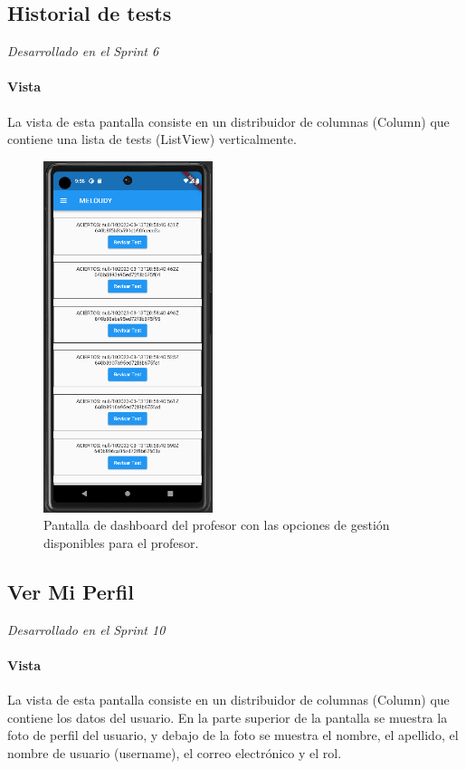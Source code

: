 \subsection{Historial de tests}
\textit{Desarrollado en el Sprint 6}
\label{sec:historial}

\paragraph*{Vista}
\label{sec:vista}
La vista de esta pantalla consiste en un distribuidor de columnas (Column) que contiene una lista de tests (ListView) verticalmente. 

\begin{figure}[H]
  \centering
  \includegraphics[width=0.44\textwidth]{imagenes/c7/historialtest.png}
  \caption{Pantalla de dashboard del profesor con las opciones de gestión disponibles para el profesor.}
  \label{fig:login}
\end{figure}


\subsection{Ver Mi Perfil}
\textit{Desarrollado en el Sprint 10}
\label{sec:miperfil}

\paragraph*{Vista}
\label{sec:vista}
La vista de esta pantalla consiste en un distribuidor de columnas (Column) que contiene los datos del usuario.
En la parte superior de la pantalla se muestra la foto de perfil del usuario, y debajo de la foto se muestra el nombre, el apellido, el nombre de usuario (username), el correo electrónico y el rol.


